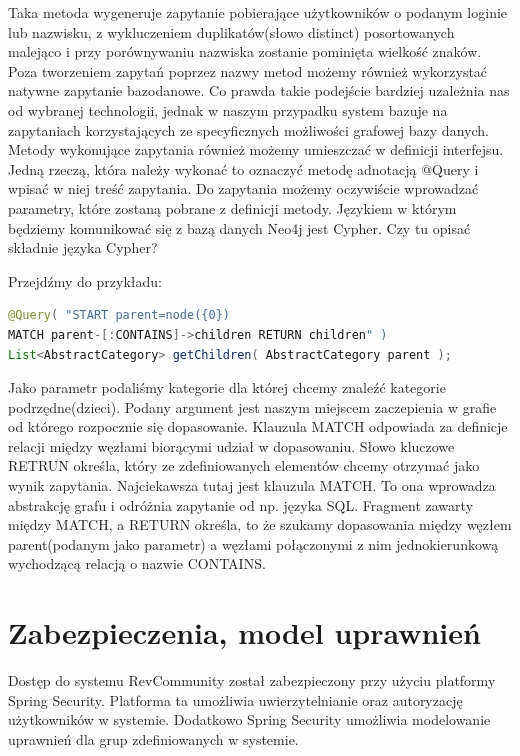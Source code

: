 Taka metoda wygeneruje zapytanie pobierające użytkowników o podanym loginie lub nazwisku, z wykluczeniem duplikatów(słowo distinct) posortowanych malejąco i przy porównywaniu nazwiska zostanie pominięta wielkość znaków. 
Poza tworzeniem zapytań poprzez nazwy metod możemy również wykorzystać natywne zapytanie bazodanowe. Co prawda takie podejście bardziej uzależnia nas od wybranej technologii, jednak w naszym przypadku system bazuje na zapytaniach korzystających ze specyficznych możliwości grafowej bazy danych. Metody wykonujące zapytania również możemy umieszczać w definicji interfejsu. Jedną rzeczą, która należy wykonać to oznaczyć metodę adnotacją @Query i wpisać w niej treść zapytania. Do zapytania możemy oczywiście wprowadzać parametry, które zostaną pobrane z definicji metody. Językiem w którym będziemy komunikować się z bazą danych Neo4j jest Cypher. 
Czy tu opisać składnie języka Cypher?

Przejdźmy do przykładu:

\begin{lstlisting}[language=Java]
@Query( "START parent=node({0}) 
MATCH parent-[:CONTAINS]->children RETURN children" )
List<AbstractCategory> getChildren( AbstractCategory parent );
\end{lstlisting}

Jako parametr podaliśmy kategorie dla której chcemy znaleźć kategorie podrzędne(dzieci). Podany argument jest naszym miejscem zaczepienia w grafie od którego rozpocznie się dopasowanie. Klauzula MATCH odpowiada za definicje relacji między węzłami biorącymi udział w dopasowaniu. Słowo kluczowe RETRUN określa, który ze zdefiniowanych elementów chcemy otrzymać jako wynik zapytania. Najciekawsza tutaj jest klauzula MATCH. To ona wprowadza abstrakcję grafu i odróżnia zapytanie od np. języka SQL. Fragment zawarty między MATCH, a RETURN określa, to że szukamy dopasowania między węzłem parent(podanym jako parametr) a węzłami połączonymi z nim  jednokierunkową wychodzącą relacją o nazwie CONTAINS. 

\section{Zabezpieczenia, model uprawnień}

Dostęp do systemu RevCommunity został zabezpieczony przy użyciu platformy Spring Security. Platforma ta umożliwia uwierzytelnianie oraz autoryzację użytkowników w systemie. Dodatkowo Spring Security umożliwia modelowanie uprawnień dla grup zdefiniowanych w systemie.

